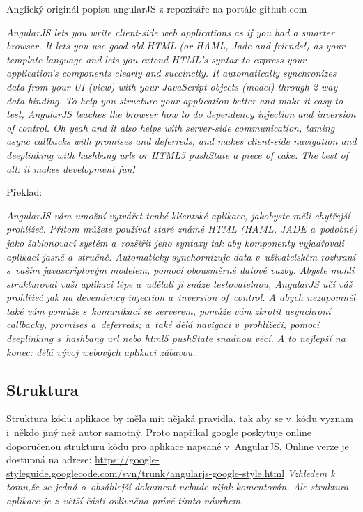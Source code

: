 \documentclass[a4paper,12pt,twoside,BCOR=10mm]{article}
\renewcommand{\it}[1]{\textit{#1}}    %
\begin{document}
Anglický originál popisu angularJS z repozitáře na portále github.com


\it{AngularJS lets you write client-side web applications as if you had a smarter browser. It lets you use good old HTML (or HAML, Jade and friends!) as your template language and lets you extend HTML’s syntax to express your application’s components clearly and succinctly. It automatically synchronizes data from your UI (view) with your JavaScript objects (model) through 2-way data binding. To help you structure your application better and make it easy to test, AngularJS teaches the browser how to do dependency injection and inversion of control. Oh yeah and it also helps with server-side communication, taming async callbacks with promises and deferreds; and makes client-side navigation and deeplinking with hashbang urls or HTML5 pushState a piece of cake. The best of all: it makes development fun!}\cite{angularGITHUB}

Překlad:

\it{AngularJS vám umožní vytvářet tenké klientské aplikace, jakobyste měli chytřejší prohlížeč. Přitom můžete používat staré známé HTML (HAML, JADE a~podobné) jako šablonovací systém a~rozšířit jeho syntaxy tak aby komponenty vyjadřovali aplikaci jasně a~stručně. Automaticky synchornizuje data v~uživatelském rozhraní s~vaším javascriptovým modelem, pomocí obousměrné datové vazby. Abyste mohli strukturovat vaši aplikaci lépe a~udělali ji snáze testovatelnou, AngularJS učí váš prohlížeč jak na devendency injection a~inversion of~control. A abych nezapomněl také vám pomůže s~komunikací se serverem, pomůže vám zkrotit asynchroní callbacky, promises a~deferreds; a~také dělá navigaci v~prohlížeči, pomocí deeplinking s~hashbang url nebo html5 pushState snadnou věcí. A to nejlepší na konec: dělá vývoj webových aplikací zábavou.}\cite{angularGITHUB}

\subsection{Struktura}
Struktura kódu aplikace by měla mít nějaká pravidla, tak aby se v~kódu vyznam i~někdo jiný než autor samotný. Proto napříkal google poskytuje online doporučenou strukturu kódu pro aplikace napsané v~AngularJS. Online verze je dostupná na adrese: \href{https://google-styleguide.googlecode.com/svn/trunk/angularjs-google-style.html}{https://google-styleguide.googlecode.com/svn/trunk/angularjs-google-style.html}
\it{Vzhledem k tomu,že se jedná o~obsáhlejší dokument nebude nijak komentován. Ale struktura aplikace je z~větší části ovlivněna právě tímto návrhem.}
\end{document}
